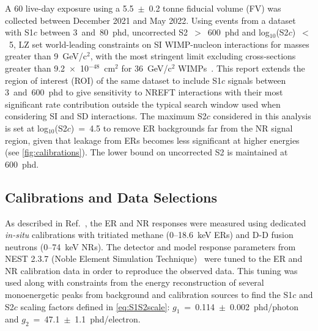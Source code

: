 \documentclass[reprint, showpacs,
preprintnumbers,
amsmath,amssymb,
aps, floatfix,
superscriptaddress,
prd, nofootinbib]{revtex4-1}
\begin{document}
A 60 live-day exposure using a 5.5~$\pm$~0.2 tonne fiducial volume (FV) was collected between December 2021 and May 2022. 
Using events from a dataset with S1$c$ between 3~and~80~phd, uncorrected S2~$>$~600~phd and log$_{10}$(S2$c$)~$<$~5, LZ set world-leading constraints on SI WIMP-nucleon interactions for masses greater than 9~GeV/c$^2$, 
with the most stringent limit excluding cross-sections greater than 9.2~$\times$~10$^{-48}$~cm$^2$ for 36~GeV/c$^2$ WIMPs~\cite{LZ:SR1WS_2022}. 
This report extends the region of interest (ROI) of the same dataset to include S1$c$ signals between 3~and~600~phd to give sensitivity to NREFT interactions with their most significant rate contribution outside the typical search window used when considering SI and SD interactions. 
The maximum S2$c$ considered in this analysis is set at log$_{10}$(S2$c$)~=~4.5 to remove ER backgrounds far from the NR signal region, given that leakage from ERs becomes less significant at higher energies (see \autoref{fig:calibrations}).
The lower bound on uncorrected S2 is maintained at 600~phd.

\subsection{\label{subsec:cal_and_data}Calibrations and Data Selections}
\par
As described in Ref.~\cite{LZ:SR1WS_2022}, the ER and NR responses were measured using dedicated \textit{in-situ} calibrations with tritiated methane (0--18.6~keV ERs) and D-D fusion neutrons (0--74~keV NRs). 
The detector and model response parameters from NEST 2.3.7 (Noble Element Simulation Technique)~\cite{NEST:paper_2022, NEST:paper_2023} were tuned to the ER and NR calibration data in order to reproduce the observed data. 
This tuning was used along with constraints from the energy reconstruction of several monoenergetic peaks from background and calibration sources to find the S1$c$ and S2$c$ scaling factors defined in \autoref{eq:S1S2scale}: $g_1$~=~0.114~$\pm$~0.002~phd/photon and $g_2$~=~47.1~$\pm$~1.1~phd/electron. 
\end{document}

